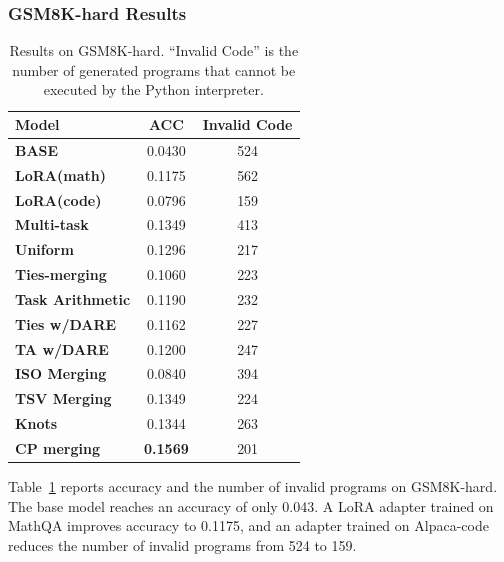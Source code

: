 \documentclass[10pt]{article} %
\begin{document}
    \subsubsection{GSM8K-hard Results}
    \begin{table}[h]
        \centering
        \begin{tabular}{l|cc}
            \toprule Model               & ACC             & Invalid Code\\
            \midrule \textbf{BASE}       & 0.0430          & 524          \\
            \textbf{LoRA(math)}          & 0.1175          & 562          \\
            \textbf{LoRA(code)}          & 0.0796          & 159          \\
            \textbf{Multi-task}          & 0.1349          & 413          \\
            \textbf{Uniform}             & 0.1296          & 217          \\
            \textbf{Ties-merging}        & 0.1060          & 223          \\
            \textbf{Task Arithmetic}     & 0.1190          & 232          \\
            \textbf{Ties w/DARE}         & 0.1162          & 227          \\
            \textbf{TA w/DARE}           & 0.1200          & 247          \\
            \textbf{ISO Merging} & 0.0840 & 394 \\
            \textbf{TSV Merging}         & 0.1349          & 224          \\
            
            \textbf{Knots} & 0.1344 & 263\\
            \midrule \textbf{CP merging} & \textbf{0.1569} & 201          \\
            \midrule
            \bottomrule
        \end{tabular}
        \caption{Results on GSM8K-hard. ``Invalid Code'' is the number of
        generated programs that cannot be executed by the Python interpreter.}
        \label{tab:math-hard}
    \end{table}
    Table~\ref{tab:math-hard} reports accuracy and the number of invalid
    programs on GSM8K-hard. The base model reaches an accuracy of only 0.043.
    A LoRA adapter trained on MathQA improves accuracy to 0.1175, and an adapter
    trained on Alpaca-code reduces the number of invalid programs from 524 to 159.
\end{document}
